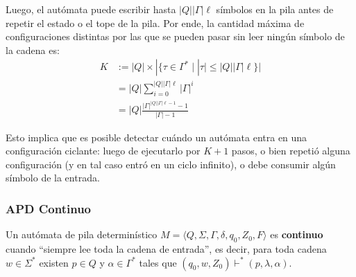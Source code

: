 Luego, el autómata puede escribir hasta $|Q| |\Gamma| \ell$ símbolos en la pila antes de repetir el estado o el tope de la pila. Por ende, la cantidad máxima de configuraciones distintas por las que se pueden pasar sin leer ningún símbolo de la cadena es:
$$
\begin{aligned}
    K & := |Q| \times |\{\tau \in \Gamma^* \mid |\tau| \leq |Q| |\Gamma| \ell\}| \\
    & = |Q| \sum_{i=0}^{|Q| |\Gamma| \ell} |\Gamma|^i \\
    & = |Q| \frac{|\Gamma|^{|Q| |\Gamma| \ell - 1} - 1}{|\Gamma| - 1}
\end{aligned}
$$

Esto implica que es posible detectar cuándo un autómata entra en una configuración ciclante: luego de ejecutarlo por $K + 1$ pasos, o bien repetió alguna configuración (y en tal caso entró en un ciclo infinito), o debe consumir algún símbolo de la entrada.

\subsubsection{APD Continuo}

Un autómata de pila determinístico $M = \langle Q, \Sigma, \Gamma, \delta, q_0, Z_0, F \rangle$ es \textbf{continuo} cuando ``siempre lee toda la cadena de entrada'', es decir, para toda cadena $w \in \Sigma^*$ existen $p \in Q$ y $\alpha \in \Gamma^*$ tales que $(q_0, w, Z_0) \vdash^* (p, \lambda, \alpha)$.


